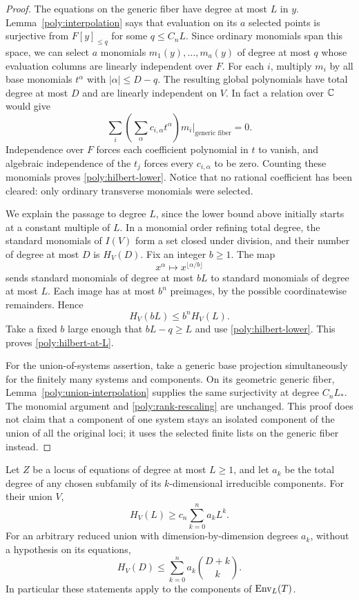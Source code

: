 \begin{proof}
The equations on the generic fiber have degree at most $L$ in $y$.
Lemma~\ref{poly:interpolation} says that evaluation on its $a$ selected
points is surjective from $F[y]_{\le q}$ for some $q\le C_nL$.
Since ordinary monomials span this space, we can select $a$ monomials
$m_1(y),\ldots,m_a(y)$ of degree at most $q$ whose evaluation columns
are linearly independent over $F$.  For each $i$, multiply $m_i$ by
all base monomials $t^\alpha$ with $|\alpha|\le D-q$.  The resulting
global polynomials have total degree at most $D$ and are linearly
independent on $V$.  In fact a relation over $\mathbb C$ would give
\[
 \sum_i\left(\sum_\alpha c_{i,\alpha}t^\alpha\right)
                m_i\big|_{\text{generic fiber}}=0.
\]
Independence over $F$ forces each coefficient polynomial in $t$ to
vanish, and algebraic independence of the $t_j$ forces every
$c_{i,\alpha}$ to be zero.  Counting these monomials proves
\eqref{poly:hilbert-lower}.  Notice that no rational coefficient has
been cleared: only ordinary transverse monomials were selected.

We explain the passage to degree $L$, since the lower bound above
initially starts at a constant multiple of $L$.  In a monomial order
refining total degree, the standard monomials of $I(V)$ form a set
closed under division, and their number of degree at most $D$ is
$H_V(D)$.  Fix an integer $b\ge1$.  The map
\[
 x^\alpha\longmapsto x^{\lfloor\alpha/b\rfloor}
\]
sends standard monomials of degree at most $bL$ to standard monomials
of degree at most $L$.  Each image has at most $b^n$ preimages, by
the possible coordinatewise remainders.  Hence
\begin{equation}\label{poly:rank-rescaling}
 H_V(bL)\le b^n H_V(L).
\end{equation}
Take a fixed $b$ large enough that $bL-q\ge L$ and use
\eqref{poly:hilbert-lower}.  This proves \eqref{poly:hilbert-at-L}.

For the union-of-systems assertion, take a generic base projection
simultaneously for the finitely many systems and components.  On its
geometric generic fiber, Lemma~\ref{poly:union-interpolation} supplies
the same surjectivity at degree $C_nL_*$.  The monomial argument and
\eqref{poly:rank-rescaling} are unchanged.  This proof does not claim
that a component of one system stays an isolated component of the
union of all the original loci; it uses the selected finite lists
on the generic fiber instead.
\end{proof}

\begin{corollary}\label{poly:envelope}
Let $Z$ be a locus of equations of degree at most $L\ge1$, and let
$a_k$ be the total degree of any chosen subfamily of its
$k$-dimensional irreducible components.  For their union $V$,
\[
 H_V(L)\ge c_n\sum_{k=0}^n a_kL^k.
\]
For an arbitrary reduced union with dimension-by-dimension degrees
$a_k$, without a hypothesis on its equations,
\[
 H_V(D)\le\sum_{k=0}^n a_k\binom{D+k}{k}.
\]
In particular these statements apply to the components of
$\operatorname{Env}_L(T)$.
\end{corollary}

